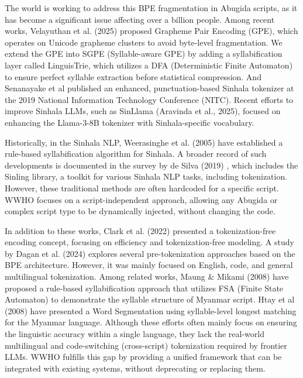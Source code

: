 The world is working to address this BPE fragmentation in Abugida scripts, as it has become a significant issue affecting over a billion people. Among recent works, Velayuthan et al. (2025) proposed Grapheme Pair Encoding (GPE)\cite {velayuthan2025gpe}, which operates on Unicode grapheme clusters to avoid byte-level fragmentation. We extend the GPE into SGPE (Syllable-aware GPE) by adding a syllabification layer called LinguisTrie, which utilizes a DFA (Deterministic Finite Automaton) to ensure perfect syllable extraction before statistical compression. And Senanayake et al published an enhanced, punctuation-based Sinhala tokenizer at the 2019 National Information Technology Conference (NITC)\cite{punctuation2019tok}. Recent efforts to improve Sinhala LLMs, such as SinLlama (Aravinda et al., 2025), focused on enhancing the Llama-3-8B tokenizer with Sinhala-specific vocabulary\cite{aravinda2025sinllama}.

Historically, in the Sinhala NLP, Weerasinghe et al. (2005) have established a rule-based syllabification algorithm for Sinhala\cite{weerasinghe2005rule}. A broader record of such developments is documented in the survey by de Silva (2019) \cite{nisansa2019survey}, which includes the Sinling library\cite{sinling}, a toolkit for various Sinhala NLP tasks, including tokenization. However, these traditional methods are often hardcoded for a specific script. WWHO focuses on a script-independent approach, allowing any Abugida or complex script type to be dynamically injected, without changing the code. 

In addition to these works, Clark et al. (2022) presented a tokenization-free encoding concept, focusing on efficiency and tokenization‑free modeling\cite{clark2022canine}. A study by Dagan et al. (2024) explores several pre-tokenization approaches based on the BPE architecture\cite{dagan2024getting}. However, it was mainly focused on English, code, and general multilingual tokenization.
Among related works, Maung \& Mikami (2008) have proposed a rule-based syllabification approach that utilizes FSA (Finite State Automaton) to demonstrate the syllable
structure of Myanmar script\cite{myanmar2008fsa}. Htay et al (2008) have presented a Word Segmentation using syllable-level longest matching for the Myanmar language\cite{htay2008myanmar}.
 Although these efforts often mainly focus on ensuring the linguistic accuracy within a single language, they lack the real-world multilingual and code-switching (cross-script) tokenization required by frontier LLMs. WWHO fulfills this gap by providing a unified framework that can be integrated with existing systems, without deprecating or replacing them. 
